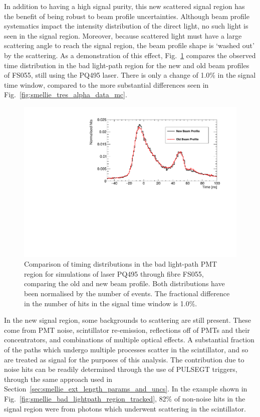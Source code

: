 In addition to having a high signal purity, this new scattered signal region has the benefit of being robust to beam profile uncertainties. Although beam profile systematics impact the intensity distribution of the direct light, no such light is seen in the signal region. Moreover, because scattered light must have a large scattering angle to reach the signal region, the beam profile shape is `washed out' by the scattering. As a demonstration of this effect, Fig.~\ref{fig:smellie_bad_lightpath_region_beamprofile_comparison} compares the observed time distribution in the bad light-path region for the new and old beam profiles of FS055, still using the PQ495 laser. There is only a change of 1.0\% in the signal time window, compared to the more substantial differences seen in Fig.~\ref{fig:smellie_tres_alpha_data_mc}.

\begin{figure}
    \centering
    \includegraphics[width=\textwidth]{5_SMELLIEAnalysis/images/FS055_PQ495_new_vs_old_beam_profile_bad_lightpath_timeplot.pdf}
    \caption[Comparison of timing distributions in the bad light-path PMT region for simulations of laser PQ495 through fibre FS055, comparing the old and new beam profile]
    {Comparison of timing distributions in the bad light-path PMT region for simulations of laser PQ495 through fibre FS055, comparing the old and new beam profile. Both distributions have been normalised by the number of events. The fractional difference in the number of hits in the signal time window is 1.0\%.}
    \label{fig:smellie_bad_lightpath_region_beamprofile_comparison}
\end{figure}

In the new signal region, some backgrounds to scattering are still present. These come from PMT noise, scintillator re-emission, reflections off of PMTs and their concentrators, and combinations of multiple optical effects. A substantial fraction of the paths which undergo multiple processes scatter in the scintillator, and so are treated as signal for the purposes of this analysis. The contribution due to noise hits can be readily determined through the use of PULSEGT triggers, through the same approach used in Section~\ref{sec:smellie_ext_length_params_and_uncs}. In the example shown in Fig.~\ref{fig:smellie_bad_lightpath_region_tracked}, 82\% of non-noise hits in the signal region were from photons which underwent scattering in the scintillator.

